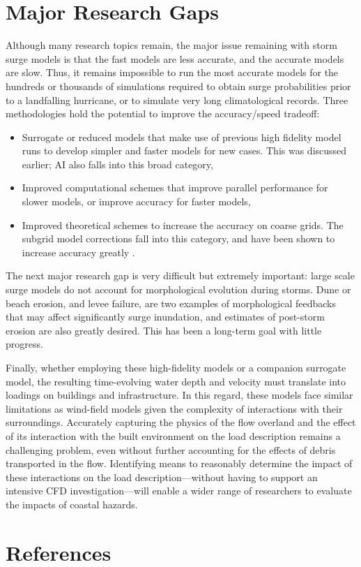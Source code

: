 \section{Major Research Gaps}
\label{sec:storm_surge_gaps}

Although many research topics remain, the major issue remaining with storm surge models is that the fast models are less accurate, and the accurate models are slow. Thus, it remains impossible to run the most accurate models for the hundreds or thousands of simulations required to obtain surge probabilities prior to a landfalling hurricane, or to simulate very long climatological records. Three methodologies hold the potential to improve the accuracy/speed tradeoff:

\begin{itemize}
    \item Surrogate or reduced models that make use of previous high fidelity model runs to develop simpler and faster models for new cases. This was discussed earlier; AI also falls into this broad category,
    \item Improved computational schemes that improve parallel performance for slower models, or improve accuracy for faster models,
    \item Improved theoretical schemes to increase the accuracy on coarse grids. The subgrid model corrections fall into this category, and have been shown to increase accuracy greatly \citep{kennedy2019subgrid}.
\end{itemize}

The next major research gap is very difficult but extremely important: large scale surge models do not account for morphological evolution during storms. Dune or beach erosion, and levee failure, are two examples of morphological feedbacks that may affect significantly surge inundation, and estimates of post-storm erosion are also greatly desired. This has been a long-term goal with little progress.

Finally, whether employing these high-fidelity models or a companion surrogate model, the resulting time-evolving water depth and velocity must translate into loadings on buildings and infrastructure. In this regard, these models face similar limitations as wind-field models given the complexity of interactions with their surroundings. Accurately capturing the physics of the flow overland and the effect of its interaction with the built environment on the load description remains a challenging problem, even without further accounting for the effects of debris transported in the flow. Identifying means to reasonably determine the impact of these interactions on the load description—without having to support an intensive CFD investigation—will enable a wider range of researchers to evaluate the impacts of coastal hazards. 
 
\section{References}
